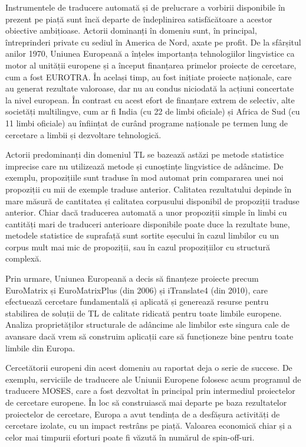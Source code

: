 \begin{multicols}{2}
Instrumentele de traducere automată și de prelucrare a vorbirii disponibile în prezent pe piață sunt încă departe de îndeplinirea satisfăcătoare a acestor obiective ambițioase. Actorii dominanți în domeniu sunt, în principal, întreprinderi private cu sediul în America de Nord, axate pe profit. De la sfârșitul anilor 1970, Uniunea Europeană a înțeles importanța tehnologiilor lingvistice ca motor al unității europene și a început finanțarea primelor proiecte de cercetare, cum a fost EUROTRA. În același timp, au fost inițiate proiecte naționale, care au generat rezultate valoroase, dar nu au condus niciodată la acțiuni concertate la nivel european. În contrast cu acest efort de finanțare extrem de selectiv, alte societăți multilingve, cum ar fi India (cu 22 de limbi oficiale) și Africa de Sud (cu 11 limbi oficiale) au înființat de curând programe naționale pe termen lung de cercetare a limbii și dezvoltare tehnologică.


Actorii predominanți din domeniul TL se bazează astăzi pe metode statistice imprecise care nu utilizează metode și cunoștințe lingvistice de adâncime. De exemplu, propozițiile sunt traduse în mod automat prin compararea unei noi propoziții cu mii de exemple traduse anterior. Calitatea rezultatului depinde în mare măsură de cantitatea și calitatea corpusului disponibil de propoziții traduse anterior. Chiar dacă traducerea automată a unor propoziții simple în limbi cu cantități mari de traduceri anterioare disponibile poate duce la rezultate bune, metodele statistice de suprafață sunt sortite eșecului în cazul limbilor cu un corpus mult mai mic de propoziții, sau în cazul propozițiilor cu structură complexă.

Prin urmare, Uniunea Europeană a decis să finanțeze proiecte precum EuroMatrix și EuroMatrixPlus (din 2006) și iTranslate4 (din 2010), care efectuează cercetare fundamentală și aplicată și generează resurse pentru stabilirea de soluții de TL de calitate ridicată pentru toate limbile europene. Analiza proprietăților structurale de adâncime ale limbilor este singura cale de avansare dacă vrem să construim aplicații care să funcționeze bine pentru toate limbile din Europa.

Cercetătorii europeni din acest domeniu au raportat deja o serie de succese. De exemplu, serviciile de traducere ale Uniunii Europene folosesc acum programul de traducere MOSES, care a fost dezvoltat în principal prin intermediul proiectelor de cercetare europene. În loc să construiască mai departe pe baza rezultatelor proiectelor de cercetare, Europa a avut tendința de a desfășura activități de cercetare izolate, cu un impact restrâns pe piață. Valoarea economică chiar și a celor mai timpurii eforturi poate fi văzută în numărul de spin-off-uri.


\end{multicols}
